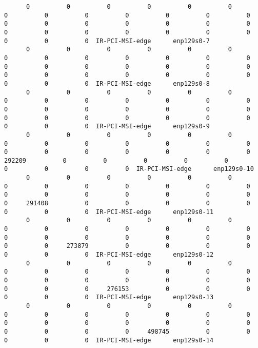 \begin{lstlisting}
      0          0          0          0          0          0          0          0          0          0          0          0          0          0          0          0          0          0          0          0          0          0          0          0          0          0          0          0          0          0  IR-PCI-MSI-edge      enp129s0-7
      0          0          0          0          0          0          0          0          0          0          0          0          0          0          0          0          0          0          0          0          0          0          0          0          0          0          0          0          0          0  IR-PCI-MSI-edge      enp129s0-8
      0          0          0          0          0          0          0          0          0          0          0          0          0          0          0          0          0          0          0          0          0          0          0          0          0          0          0          0          0          0  IR-PCI-MSI-edge      enp129s0-9
      0          0          0          0          0          0          0          0          0          0          0          0          0          0          0          0          0          0          0          0     292209          0          0          0          0          0          0          0          0          0  IR-PCI-MSI-edge      enp129s0-10
      0          0          0          0          0          0          0          0          0          0          0          0          0          0          0          0          0          0          0          0          0     291408          0          0          0          0          0          0          0          0  IR-PCI-MSI-edge      enp129s0-11
      0          0          0          0          0          0          0          0          0          0          0          0          0          0          0          0          0          0          0          0          0          0     273879          0          0          0          0          0          0          0  IR-PCI-MSI-edge      enp129s0-12
      0          0          0          0          0          0          0          0          0          0          0          0          0          0          0          0          0          0          0          0          0          0          0     276153          0          0          0          0          0          0  IR-PCI-MSI-edge      enp129s0-13
      0          0          0          0          0          0          0          0          0          0          0          0          0          0          0          0          0          0          0          0          0          0          0          0     498745          0          0          0          0          0  IR-PCI-MSI-edge      enp129s0-14

\end{lstlisting}
